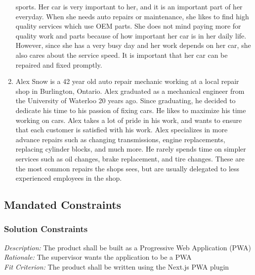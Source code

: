 \documentclass[12pt]{article}
\begin{document}
\begin{enumerate}
	      sports. Her car is very important to her, and it is an important part of her everyday. When she
	      needs auto repairs or maintenance, she likes to find high quality services which use OEM parts. She
	      does not mind paying more for quality work and parts because of how important her car is in her
	      daily life. However, since she has a very busy day and her work depends on her car, she also cares
	      about the service speed. It is important that her car can be repaired and fixed promptly.
	\item Alex Snow is a 42 year old auto repair mechanic working at a local repair shop in Burlington,
	      Ontario. Alex graduated as a mechanical engineer from the University of Waterloo 20 years ago.
	      Since graduating, he decided to dedicate his time to his passion of fixing cars. He likes to
	      maximize his time working on cars. Alex takes a lot of pride in his work, and wants to ensure that
	      each customer is satisfied with his work. Alex specializes in more advance repairs such as changing
	      transmissions, engine replacements, replacing cylinder blocks, and much more. He rarely spends time
	      on simpler services such as oil changes, brake replacement, and tire changes. These are the most
	      common repairs the shops sees, but are usually delegated to less experienced employees in the shop.
\end{enumerate}
\subsection{Mandated Constraints}

\subsubsection{Solution Constraints}
\emph{Description:} The product shall be built as a Progressive Web Application (PWA)\\
\emph{Rationale:} The supervisor wants the application to be a PWA\\
\emph{Fit Criterion:} The product shall be written using the Next.js PWA plugin
\end{document}
